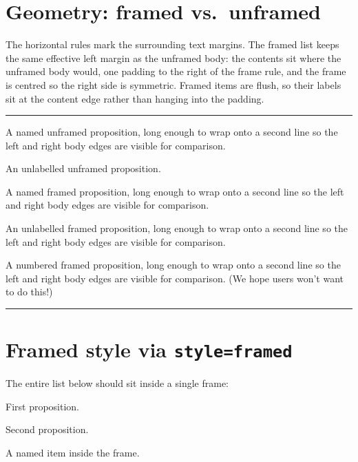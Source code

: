 \documentclass{article}
\begin{document}
\section{Geometry: framed vs.\ unframed}

The horizontal rules mark the surrounding text margins.  The framed list keeps
the same effective left margin as the unframed body: the contents sit where the
unframed body would, one padding to the right of the frame rule, and the frame
is centred so the right side is symmetric.  Framed items are flush, so their
labels sit at the content edge rather than hanging into the padding.

\noindent\rule{\textwidth}{0.3pt}

\begin{prop}
  \item[name=Claim] A named unframed proposition, long enough to wrap onto a
  second line so the left and right body edges are visible for comparison.
  \item[counter=none] An unlabelled unframed proposition.
\end{prop}

\begin{prop}[style=framed]
  \item[name=Claim] A named framed proposition, long enough to wrap onto a second
  line so the left and right body edges are visible for comparison.
  \item[counter=none] An unlabelled framed proposition, long enough to wrap onto a second
  line so the left and right body edges are visible for comparison.
  \item A numbered framed proposition, long enough to wrap onto a second
  line so the left and right body edges are visible for comparison.  (We hope users won't want to do this!)
\end{prop}

\noindent\rule{\textwidth}{0.3pt}

\section{Framed style via \texttt{style=framed}}

The entire list below should sit inside a single frame:

\begin{prop}[style=framed]
  \item First proposition. \label{w:first}
  \item Second proposition. \label{w:second}
  \item[Key Claim] A named item inside the frame. \label{w:named}
\end{prop}
\end{document}
